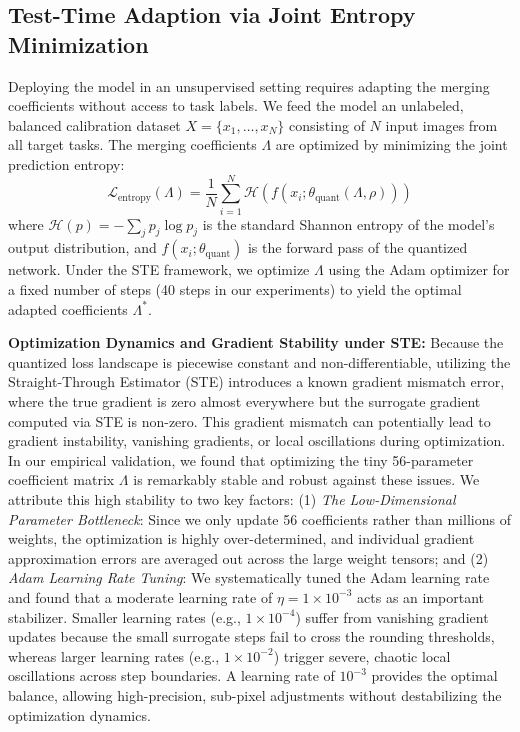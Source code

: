 \subsection{Test-Time Adaption via Joint Entropy Minimization}
Deploying the model in an unsupervised setting requires adapting the merging coefficients without access to task labels. We feed the model an unlabeled, balanced calibration dataset $X = \{x_1, \dots, x_N\}$ consisting of $N$ input images from all target tasks. The merging coefficients $\Lambda$ are optimized by minimizing the joint prediction entropy:
\begin{equation}
\label{eq:entropy_loss}
\mathcal{L}_{\text{entropy}}(\Lambda) = \frac{1}{N} \sum_{i=1}^N \mathcal{H}\left(f\left(x_i; \theta_{\text{quant}}(\Lambda, \rho)\right)\right)
\end{equation}
where $\mathcal{H}(p) = -\sum_j p_j \log p_j$ is the standard Shannon entropy of the model's output distribution, and $f(x_i; \theta_{\text{quant}})$ is the forward pass of the quantized network. Under the STE framework, we optimize $\Lambda$ using the Adam optimizer for a fixed number of steps (40 steps in our experiments) to yield the optimal adapted coefficients $\Lambda^*$.

\textbf{Optimization Dynamics and Gradient Stability under STE:}
Because the quantized loss landscape is piecewise constant and non-differentiable, utilizing the Straight-Through Estimator (STE) introduces a known gradient mismatch error, where the true gradient is zero almost everywhere but the surrogate gradient computed via STE is non-zero. This gradient mismatch can potentially lead to gradient instability, vanishing gradients, or local oscillations during optimization. In our empirical validation, we found that optimizing the tiny 56-parameter coefficient matrix $\Lambda$ is remarkably stable and robust against these issues. We attribute this high stability to two key factors: (1) \emph{The Low-Dimensional Parameter Bottleneck}: Since we only update 56 coefficients rather than millions of weights, the optimization is highly over-determined, and individual gradient approximation errors are averaged out across the large weight tensors; and (2) \emph{Adam Learning Rate Tuning}: We systematically tuned the Adam learning rate and found that a moderate learning rate of $\eta = 1 \times 10^{-3}$ acts as an important stabilizer. Smaller learning rates (e.g., $1 \times 10^{-4}$) suffer from vanishing gradient updates because the small surrogate steps fail to cross the rounding thresholds, whereas larger learning rates (e.g., $1 \times 10^{-2}$) trigger severe, chaotic local oscillations across step boundaries. A learning rate of $10^{-3}$ provides the optimal balance, allowing high-precision, sub-pixel adjustments without destabilizing the optimization dynamics.

